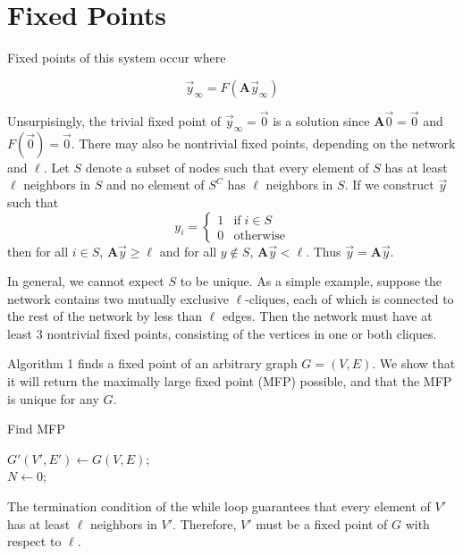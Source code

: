 \documentclass[12pt]{article}
\begin{document}
\section{Fixed Points}

Fixed points of this system occur where

\begin{equation}
  \vec{y}_{\infty} = F(\mathbf{A}\vec{y}_{\infty})
\end{equation}

Unsurpisingly, the trivial fixed point of $\vec{y}_{\infty} = \vec{0}$ is a solution since $\mathbf{A}\vec{0} = \vec{0}$ and $F(\vec{0}) = \vec{0}$.  There may also be nontrivial fixed points, depending on the network and $\ell$.  Let $S$ denote a subset of nodes such that every element of $S$ has at least $\ell$ neighbors in $S$ and no element of $S^C$ has $\ell$ neighbors in $S$.  If we construct $\vec{y}$ such that  
\begin{equation}
  y_i = \begin{cases}
    1 &\text{if} \; i \in S \\
    0 &\text{otherwise}
  \end{cases}
\end{equation}
 then for all $i \in S$, $\mathbf{A}\vec{y} \geq \ell$ and for all $y \notin S$, $\mathbf{A}\vec{y} < \ell$.  Thus $\vec{y} = \mathbf{A}\vec{y}$. 

In general, we cannot expect $S$ to be unique.  As a simple example, suppose the network contains two mutually exclusive $\ell$-cliques, each of which is connected to the rest of the network by less than $\ell$ edges.  Then the network must have at least 3 nontrivial fixed points, consisting of the vertices in one or both cliques.

Algorithm 1 finds a fixed point of an arbitrary graph $G=(V,E)$.  We show that it will return the maximally large fixed point (MFP) possible, and that the MFP is unique for any $G$.

\begin{algorithm}
  \caption{Find MFP}\label{alg:two}
  $G'(V', E') \gets G(V, E)$; \\
  $N \gets 0$; \\
  \end{algorithm}

  The termination condition of the while loop guarantees that every element of $V'$ has at least $\ell$ neighbors in $V'$.  Therefore, $V'$ must be a fixed point of $G$ with respect to $\ell$.  
  
\end{document}

